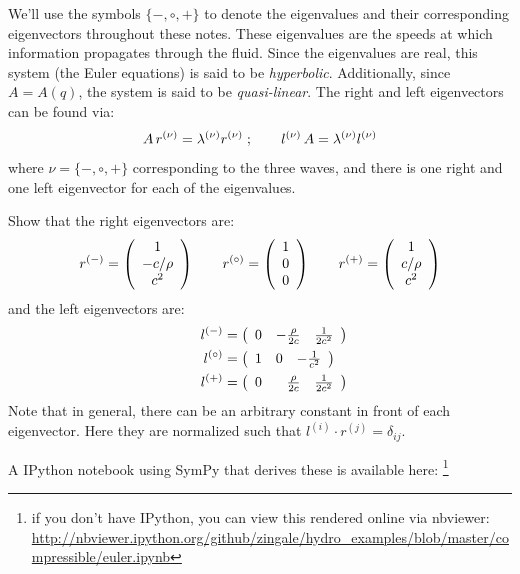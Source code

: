 We'll use the symbols $\{-,\circ,+\}$ to denote the eigenvalues and their
corresponding eigenvectors throughout these notes.
These eigenvalues are the speeds at which information propagates through
the fluid.
Since the eigenvalues are real, this system (the Euler equations) is said
to be {\em hyperbolic}.  Additionally, since $A = A(q)$, the system is
said to be {\em quasi-linear}.
%
The right and left eigenvectors can be found via:
\begin{equation}
A \, r^{(\nu)} = \lambda^{(\nu)} r^{(\nu)} \; ;
\qquad
l^{(\nu)} \, A  = \lambda^{(\nu)} l^{(\nu)}
\end{equation}
where $\nu = \{-,\circ,+\}$ corresponding to the three waves, and
there is one right and one left eigenvector for each of the eigenvalues.
%
\begin{exercise}
{
Show that the right eigenvectors are:
\begin{equation}
r^\evm = \left ( \begin{array}{c} 1 \\ -c/\rho \\ c^2 \end{array} \right )
%
\qquad
r^\evz = \left ( \begin{array}{c} 1 \\ 0 \\ 0  \end{array} \right )
%
\qquad
r^\evp = \left ( \begin{array}{c} 1 \\ c/\rho \\ c^2 \end{array} \right )
\end{equation}
and the left eigenvectors are:
\begin{align}
l^\evm &= \left ( \begin{array}{ccc} 0 & -\frac{\rho}{2c} & \frac{1}{2c^2}
                  \end{array} \right ) \\
%
\qquad
l^\evz &= \left ( \begin{array}{ccc} 1 & 0 & -\frac{1}{c^2}  \end{array} \right ) \\
%
\qquad
l^\evp &= \left ( \begin{array}{ccc} 0 & \phantom{+}\frac{\rho}{2c} & \frac{1}{2c^2} \end{array} \right )
\end{align}
Note that in general, there can be an arbitrary constant in front of each
eigenvector.  Here they are normalized such that
$l^{(i)} \cdot r^{(j)} = \delta_{ij}$.
}
\end{exercise}
A {\sf IPython} notebook using {\sf SymPy} that derives these is available here:
\footnote{if you don't have {\sf IPython}, you can view this rendered online via {\sf nbviewer}:\\
\url{http://nbviewer.ipython.org/github/zingale/hydro_examples/blob/master/compressible/euler.ipynb}}

